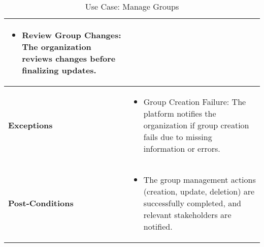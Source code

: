 \begin{table}[!ht]
\begin{tabularx}{\textwidth}{|l|X|}
\begin{itemize}[label=--,itemsep=0pt]
            \item Review Group Changes: The organization reviews changes before finalizing updates.
        \end{itemize} \\
        \hline
        \textbf{Exceptions} & 
        \begin{itemize}[label=--,itemsep=0pt]
            \item Group Creation Failure: The platform notifies the organization if group creation fails due to missing information or errors.
        \end{itemize} \\
        \hline
        \textbf{Post-Conditions} & 
        \begin{itemize}[label=--,itemsep=0pt]
            \item The group management actions (creation, update, deletion) are successfully completed, and relevant stakeholders are notified.
        \end{itemize} \\
        \hline
    \end{tabularx}
    \caption{Use Case: Manage Groups}
    \label{tab:use-case-manage-groups}
\end{table}


